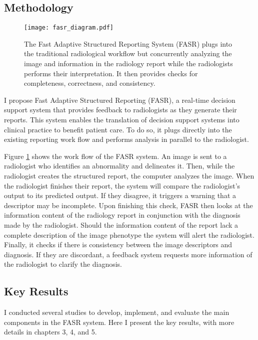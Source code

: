 \subsection{Methodology}

\begin{figure}[h]
	\centering
	\texttt{[image: fasr\_diagram.pdf]}
	\caption[Overview of the Fast Adaptive Structured Reporting (FASR) system]{The Fast Adaptive Structured Reporting System (FASR) plugs into the traditional radiological workflow but concurrently analyzing the image and information in the radiology report while the radiologists performs their interpretation. It then provides checks for completeness, correctness, and consistency.}
	\label{fig:fasr_diagram}
\end{figure}

I propose Fast Adaptive Structured Reporting (FASR), a real-time decision support system that provides feedback to radiologists as they generate their reports. This system enables the translation of decision support systems into clinical practice to benefit patient care. To do so, it plugs directly into the existing reporting work flow and performs analysis in parallel to the radiologist.

Figure \ref{fig:fasr_diagram} shows the work flow of the FASR system. An image is sent to a radiologist who identifies an abnormality and delineates it. Then, while the radiologist creates the structured report, the computer analyzes the image. When the radiologist finishes their report, the system will compare the radiologist's output to its predicted output. If they disagree, it triggers a warning that a descriptor may be incomplete. Upon finishing this check, FASR then looks at the information content of the radiology report in conjunction with the diagnosis made by the radiologist. Should the information content of the report lack a complete description of the image phenotype the system will alert the radiologist. Finally, it checks if there is consistency between the image descriptors and diagnosis. If they are discordant, a feedback system requests more information of the radiologist to clarify the diagnosis.

\subsection{Key Results}

I conducted several studies to develop, implement, and evaluate the main components in the FASR system. Here I present the key results, with more details in chapters 3, 4, and 5. 


